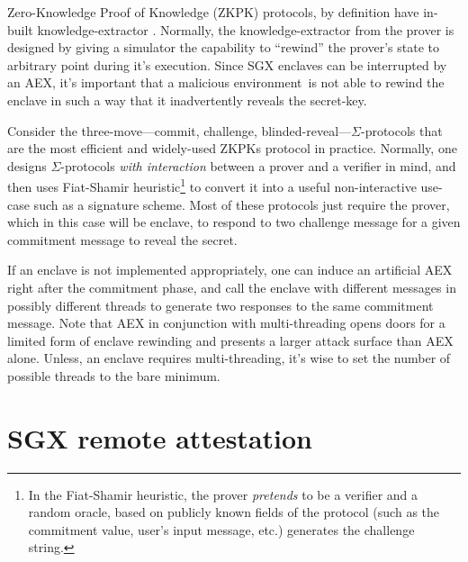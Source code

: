 \documentclass[10pt, letterpaper]{article}
\newcommand{\env}{\textsf{environment}}
\begin{document}
  Zero-Knowledge Proof of Knowledge (ZKPK) protocols, by definition
  have in-built knowledge-extractor \cite{BellarePOK, maurerZKP}.
  Normally, the knowledge-extractor from the prover is designed by
  giving a simulator the capability to ``rewind'' the prover's state
  to arbitrary point during it's execution. Since SGX enclaves can be
  interrupted by an AEX, it's important that a malicious \env\ is not
  able to rewind the enclave in such a way that it inadvertently
  reveals the secret-key.

  Consider the three-move---commit, challenge,
  blinded-reveal---$\Sigma$-protocols \cite{sigmaprotocol} that are
  the most efficient and widely-used ZKPKs protocol in practice.
  Normally, one designs $\Sigma$-protocols \textit{with interaction}
  between a prover and a verifier in mind, and then uses Fiat-Shamir
  \cite{FiatShamir} heuristic\footnote{In the Fiat-Shamir heuristic,
    the prover \textit{pretends} to be a verifier and a random oracle,
    based on publicly known fields of the protocol (such as the
    commitment value, user's input message, etc.) generates the
    challenge string.} to convert it into a useful non-interactive
  use-case such as a signature scheme. Most of these protocols just
  require the prover, which in this case will be enclave, to respond
  to two challenge message for a given commitment message to reveal
  the secret.

  If an enclave is not implemented appropriately, one can induce an
  artificial AEX right after the commitment phase, and call the
  enclave with different messages in possibly different threads to
  generate two responses to the same commitment message. Note that AEX
  in conjunction with multi-threading opens doors for a limited form of
  enclave rewinding and presents a larger attack surface than AEX
  alone.  Unless, an enclave requires multi-threading, it's wise to set
  the number of possible threads to the bare minimum.

  \section{SGX remote attestation}
  \label{sec:remoteatt}
\end{document}
